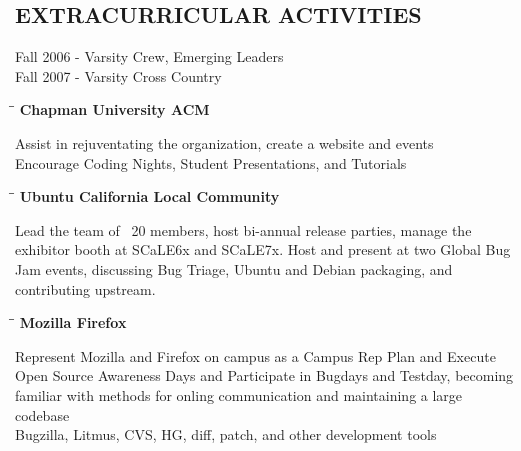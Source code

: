 \documentclass{res}
\begin{document}
\begin{resume}
\section{EXTRACURRICULAR ACTIVITIES}          
	 Fall 2006 - Varsity Crew, Emerging Leaders\\
	 Fall 2007 - Varsity Cross Country\\
	\vspace{-20pt}
   \begin{tabbing}
   \hspace{2.3in}\= \hspace{2.95in}\= \kill %
    {\bf Chapman University ACM} 
   \end{tabbing}\vspace{-12pt}      %
	 Assist in rejuventating the organization, create a website and events\\
	 Encourage Coding Nights, Student Presentations, and Tutorials\\
	\vspace{-12pt}
   \vspace{-0.1in}	
   \begin{tabbing}
   \hspace{2.3in}\= \hspace{2.95in}\= \kill %
    {\bf Ubuntu California Local Community} 
   \end{tabbing}\vspace{-12pt}      %
	Lead the team of ~20 members, host bi-annual release parties, manage the exhibitor booth at SCaLE6x and SCaLE7x.
	Host and present at two Global Bug Jam events, discussing Bug Triage, Ubuntu and Debian packaging, and contributing upstream.
	\vspace{-12pt}
   \vspace{-0.1in}	
   \begin{tabbing}
   \hspace{2.3in}\= \hspace{2.95in}\= \kill %
    {\bf Mozilla Firefox} 
   \end{tabbing}\vspace{-12pt}      %
	 Represent Mozilla and Firefox on campus as a Campus Rep
	 Plan and Execute Open Source Awareness Days and 
	 Participate in Bugdays and Testday, becoming familiar with methods for onling communication and maintaining a large codebase\\
	 Bugzilla, Litmus, CVS, HG, diff, patch, and other development tools\\

\end{resume}
\end{document}
